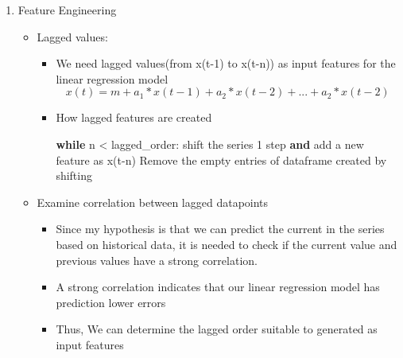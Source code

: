 \documentclass[11pt]{article}
\providecommand{\tightlist}{%
      \setlength{\itemsep}{0pt}\setlength{\parskip}{0pt}}
\newenvironment{Shaded}{}{}
\newcommand{\KeywordTok}[1]{\textcolor[rgb]{0.00,0.44,0.13}{\textbf{{#1}}}}
\newcommand{\DecValTok}[1]{\textcolor[rgb]{0.25,0.63,0.44}{{#1}}}
\newcommand{\NormalTok}[1]{{#1}}
\newcommand{\ImportTok}[1]{{#1}}
\newcommand{\ControlFlowTok}[1]{\textcolor[rgb]{0.00,0.44,0.13}{\textbf{{#1}}}}
\newcommand{\OperatorTok}[1]{\textcolor[rgb]{0.40,0.40,0.40}{{#1}}}
\begin{document}
\begin{enumerate}
\def\labelenumi{\arabic{enumi}.}
\tightlist
\item
  Feature Engineering

  \begin{itemize}
  \tightlist
  \item
    Lagged values:

    \begin{itemize}
    \item
      We need lagged values(from x(t-1) to x(t-n)) as input features for
      the linear regression model
      \[x(t) = m + a_1*x(t-1) + a_2*x(t-2) + ... + a_2*x(t-2)\]
    \item
      How lagged features are created

\begin{Shaded}
\begin{Highlighting}[]
\ControlFlowTok{while}\NormalTok{ n }\OperatorTok{<}\NormalTok{ lagged_order:}
\NormalTok{    shift the series }\DecValTok{1}\NormalTok{ step }\KeywordTok{and}\NormalTok{ add a new feature }\ImportTok{as}\NormalTok{ x(t}\OperatorTok{-}\NormalTok{n)}
\NormalTok{Remove the empty entries of dataframe created by shifting}
\end{Highlighting}
\end{Shaded}
    \end{itemize}
  \item
    Examine correlation between lagged datapoints

    \begin{itemize}
    \tightlist
    \item
      Since my hypothesis is that we can predict the current in the
      series based on historical data, it is needed to check if the
      current value and previous values have a strong correlation.
    \item
      A strong correlation indicates that our linear regression model
      has prediction lower errors
    \item
      Thus, We can determine the lagged order suitable to generated as
      input features
    \end{itemize}


\end{itemize}
\end{enumerate}
\end{document}
